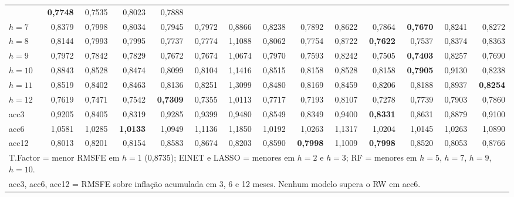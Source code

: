 \documentclass[12pt, a4paper]{article}
\begin{document}
\begin{table}[H]
{\begin{tabular}{lrrrrrrrrrrrrr}
        & \textbf{0{,}7748} & 0{,}7535 & 0{,}8023 & 0{,}7888 \\
$h=7$  & 0{,}8379 & 0{,}7998 & 0{,}8034 & 0{,}7945 & 0{,}7972
        & 0{,}8866 & 0{,}8238 & 0{,}7892 & 0{,}8622 & 0{,}7864
        & \textbf{0{,}7670} & 0{,}8241 & 0{,}8272 \\
$h=8$  & 0{,}8144 & 0{,}7993 & 0{,}7995 & 0{,}7737 & 0{,}7774
        & 1{,}1088 & 0{,}8062 & 0{,}7754 & 0{,}8722
        & \textbf{0{,}7622} & 0{,}7537 & 0{,}8374 & 0{,}8363 \\
$h=9$  & 0{,}7972 & 0{,}7842 & 0{,}7829 & 0{,}7672 & 0{,}7674
        & 1{,}0674 & 0{,}7970 & 0{,}7593 & 0{,}8242 & 0{,}7505
        & \textbf{0{,}7403} & 0{,}8257 & 0{,}7690 \\
$h=10$ & 0{,}8843 & 0{,}8528 & 0{,}8474 & 0{,}8099 & 0{,}8104
        & 1{,}1416 & 0{,}8515 & 0{,}8158 & 0{,}8528 & 0{,}8158
        & \textbf{0{,}7905} & 0{,}9130 & 0{,}8238 \\
$h=11$ & 0{,}8519 & 0{,}8402 & 0{,}8463 & 0{,}8136 & 0{,}8251
        & 1{,}3099 & 0{,}8480 & 0{,}8169 & 0{,}8459 & 0{,}8206
        & 0{,}8188 & 0{,}8937 & \textbf{0{,}8254} \\
$h=12$ & 0{,}7619 & 0{,}7471 & 0{,}7542 & \textbf{0{,}7309}
        & 0{,}7355 & 1{,}0113 & 0{,}7717 & 0{,}7193 & 0{,}8107
        & 0{,}7278 & 0{,}7739 & 0{,}7903 & 0{,}7860 \\
\midrule
acc3   & 0{,}9205 & 0{,}8405 & 0{,}8319 & 0{,}9285 & 0{,}9399
        & 0{,}9480 & 0{,}8549 & 0{,}8349 & 0{,}9400
        & \textbf{0{,}8331} & 0{,}8631 & 0{,}8879 & 0{,}9100 \\
acc6   & 1{,}0581 & 1{,}0285 & \textbf{1{,}0133} & 1{,}0949
        & 1{,}1136 & 1{,}1850 & 1{,}0192 & 1{,}0263 & 1{,}1317
        & 1{,}0204 & 1{,}0145 & 1{,}0263 & 1{,}0890 \\
acc12  & 0{,}8013 & 0{,}8201 & 0{,}8154 & 0{,}8583 & 0{,}8674
        & 0{,}8203 & 0{,}8590 & \textbf{0{,}7998} & 1{,}1009
        & \textbf{0{,}7998} & 0{,}8520 & 0{,}8053 & 0{,}8766 \\
\bottomrule
\multicolumn{14}{l}{%
  \footnotesize T.Factor = menor RMSFE em $h=1$ (0{,}8735);
  ElNET e LASSO = menores em $h=2$ e $h=3$; RF = menores em
  $h=5$, $h=7$, $h=9$, $h=10$.}\\
\multicolumn{14}{l}{%
  \footnotesize acc3, acc6, acc12 = RMSFE sobre inflação
  acumulada em 3, 6 e 12 meses. Nenhum modelo supera o RW
  em acc6.}
\end{tabular}
}
\end{table}
\end{document}
